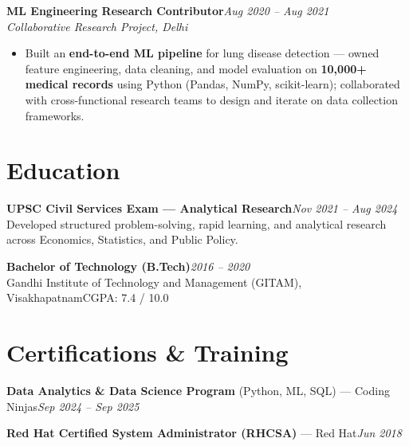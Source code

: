 \documentclass[10pt, letterpaper]{article}
\newcommand{\role}[3]{%
  \vspace{2pt}%
  {\bfseries #1}\hfill{\small\color{muted}\textit{#3}}\\[-2pt]%
  {\small\color{muted}\textit{#2}}%
}
\begin{document}
\vspace{1pt}

\role{ML Engineering Research Contributor}{Collaborative Research Project, Delhi}{Aug 2020 – Aug 2021}

\begin{itemize}
  \item Built an \textbf{end-to-end ML pipeline} for lung disease detection — owned feature engineering, data cleaning, and model evaluation on \textbf{10,000+ medical records} using Python (Pandas, NumPy, scikit-learn); collaborated with cross-functional research teams to design and iterate on data collection frameworks.
\end{itemize}

\section{Education}

{\bfseries UPSC Civil Services Exam — Analytical Research}\hfill{\small\color{muted}\textit{Nov 2021 – Aug 2024}}\\
{\small\color{muted}Developed structured problem-solving, rapid learning, and analytical research across Economics, Statistics, and Public Policy.}

\vspace{2pt}
{\bfseries Bachelor of Technology (B.Tech)}\hfill{\small\color{muted}\textit{2016 – 2020}}\\
{\small\color{muted}Gandhi Institute of Technology and Management (GITAM), Visakhapatnam\hfill CGPA: 7.4 / 10.0}

\section{Certifications \& Training}

{\bfseries Data Analytics \& Data Science Program} (Python, ML, SQL) — Coding Ninjas\hfill{\small\color{muted}\textit{Sep 2024 – Sep 2025}}

\vspace{1pt}
{\bfseries Red Hat Certified System Administrator (RHCSA)} — Red Hat\hfill{\small\color{muted}\textit{Jun 2018}}

\end{document}
